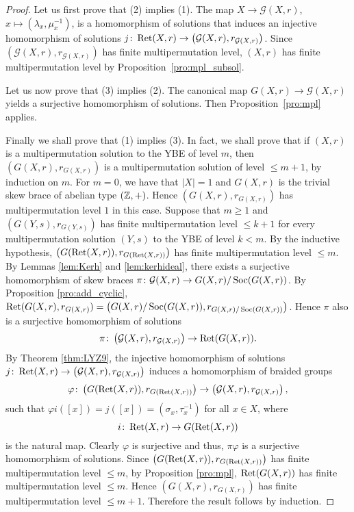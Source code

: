 \begin{proof}
    Let us first prove that (2) implies (1). 
    The map $X\to\mathcal{G}(X,r)$, $x\mapsto(\lambda_x,\mu_x^{-1})$, is a homomorphism of solutions that induces
    an injective homomorphism of solutions $j\colon\operatorname{Ret}(X,r)\to\left(\mathcal{G}(X,r),r_{\mathcal{G}(X,r)}\right)$. 
    Since $\left(\mathcal{G}(X,r),r_{\mathcal{G}(X,r)}\right)$ has finite multipermutation level,
    $(X,r)$ has finite multipermutation level by Proposition~\ref{pro:mpl_subsol}.
    
    Let us now prove that (3) implies (2). The canonical map $G(X,r)\to\mathcal{G}(X,r)$ yields a surjective
    homomorphism of solutions. Then Proposition~\ref{pro:mpl} applies. 

    Finally we shall prove that (1) implies (3). In fact, we shall prove that if $(X,r)$ is a multipermutation solution to the YBE of level $m$, then $(G(X,r),r_{G(X,r)})$ is a multipermutation solution of level $\leq m+1$, by induction on $m$. For $m=0$, we have that $|X|=1$ and $G(X,r)$ is the trivial skew brace of abelian type $(\mathbb{Z},+)$. Hence $\left(G(X,r),r_{G(X,r)}\right)$ has multipermutation level $1$ in this case. Suppose that $m\geq 1$ and $\left(G(Y,s),r_{G(Y,s)}\right)$ has finite multipermutation level $\leq k+1$ for every multipermutation solution $(Y,s)$ to the YBE of level $k<m$. By the inductive hypothesis, $\left(G(\operatorname{Ret}(X,r)),r_{G(\operatorname{Ret}(X,r))}\right)$ has finite multipermutation level $\leq m$. By Lemmas \ref{lem:Kerh} and \ref{lem:kerhideal}, there exists a surjective homomorphism of skew braces $\pi\colon \mathcal{G}(X,r)\to G(X,r)/\operatorname{Soc}(G(X,r))$. By Proposition \ref{pro:add_cyclic}, $\operatorname{Ret}(G(X,r),r_{G(X,r)})=\left( G(X,r)/\operatorname{Soc}(G(X,r)),r_{G(X,r)/\operatorname{Soc}(G(X,r))}\right)$. Hence $\pi$ also is a surjective homomorphism of solutions
    \[ \pi\colon \left(\mathcal{G}(X,r), r_{\mathcal{G}(X,r)}\right)\to \operatorname{Ret}(G(X,r)).\]
    By Theorem \ref{thm:LYZ9}, the injective homomorphism of solutions $j\colon\operatorname{Ret}(X,r)\to\left(\mathcal{G}(X,r),r_{\mathcal{G}(X,r)}\right)$ induces a homomorphism of braided groups \[\varphi\colon \left(G(\operatorname{Ret}(X,r)),r_{G(\operatorname{Ret}(X,r))}\right)\to \left(\mathcal{G}(X,r),r_{\mathcal{G}(X,r)}\right),\] such that $\varphi i([x])=j([x])=(\sigma_x,\tau^{-1}_x)$ for all $x\in X$, where \[i\colon \operatorname{Ret}(X,r)\to G(\operatorname{Ret}(X,r))\] is the natural map. Clearly $\varphi$ is surjective and thus,
    $\pi\varphi$ is a surjective homomorphism of solutions. Since $\left(G(\operatorname{Ret}(X,r)),r_{G(\operatorname{Ret}(X,r))}\right)$ has finite multipermutation level $\leq m$, by Proposition \ref{pro:mpl}, $\operatorname{Ret}(G(X,r))$ has finite multipermutation level $\leq m$. Hence $\left(G(X,r),r_{G(X,r)}\right)$ has finite multipermutation level $\leq m+1$. Therefore the result follows by induction.
    \end{proof}
    
